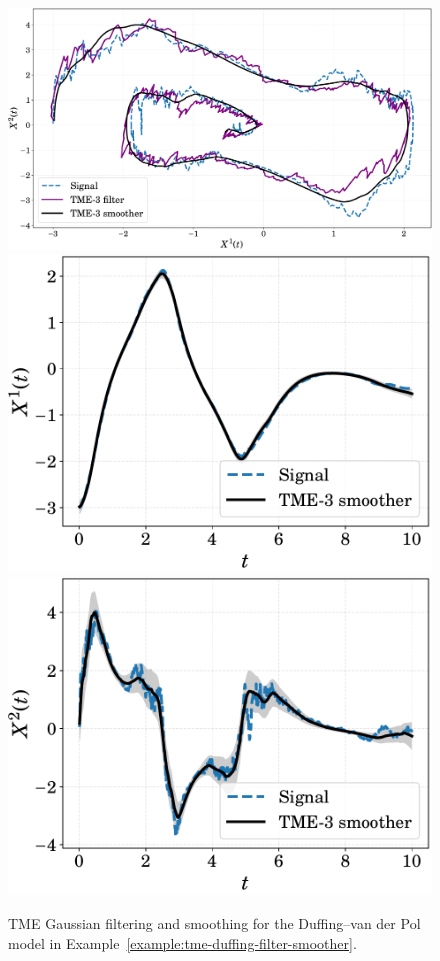 \begin{figure}[t!]
	\centering
	\includegraphics[width=.9\linewidth]{figs/tme-duffing-filter-smoother} \\
	\includegraphics[width=.494\linewidth]{figs/tme-duffing-smoother-x1}
	\includegraphics[width=.494\linewidth]{figs/tme-duffing-smoother-x2}
	\caption{TME Gaussian filtering and smoothing for the Duffing--van der Pol model in Example~\ref{example:tme-duffing-filter-smoother}. }
	\label{fig:tme-duffing-filter-smoother}
\end{figure}

